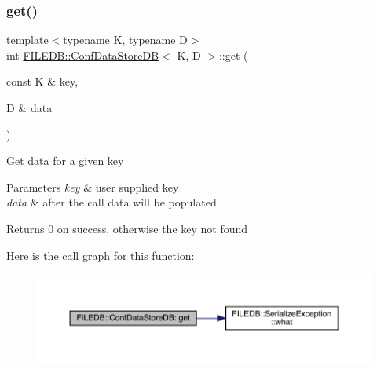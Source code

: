 \subsubsection{\texorpdfstring{get()}{get()}\hspace{0.1cm}{\footnotesize\ttfamily [2/2]}}
{\footnotesize\ttfamily template$<$typename K, typename D$>$ \\
int \mbox{\hyperlink{classFILEDB_1_1ConfDataStoreDB}{F\+I\+L\+E\+D\+B\+::\+Conf\+Data\+Store\+DB}}$<$ K, D $>$\+::get (\begin{DoxyParamCaption}\item[{const K \&}]{key,  }\item[{D \&}]{data }\end{DoxyParamCaption})\hspace{0.3cm}{\ttfamily [inline]}}

Get data for a given key 
\begin{DoxyParams}{Parameters}
{\em key} & user supplied key \\
\hline
{\em data} & after the call data will be populated \\
\hline
\end{DoxyParams}
\begin{DoxyReturn}{Returns}
0 on success, otherwise the key not found 
\end{DoxyReturn}
Here is the call graph for this function\+:
\nopagebreak
\begin{figure}[H]
\begin{center}
\leavevmode
\includegraphics[width=350pt]{d8/d19/classFILEDB_1_1ConfDataStoreDB_ad89d0c1aef7c82fb0273d50bfea7cf0a_cgraph}
\end{center}
\end{figure}
\mbox{\label{classFILEDB_1_1ConfDataStoreDB_a971e372585c497dad3b1bc589bc4dd15}} 

